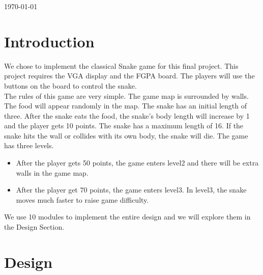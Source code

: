 \documentclass[12pt]{article}
\begin{document}
\begin{titlepage}

{\large \today}\\[2cm] %


 

\vfill %

\end{titlepage}

\newpage
\section*{Introduction}
We chose to implement the classical Snake game for this final project. This project requires the VGA display and the FGPA board. The players will use the buttons on the board to control the snake.\\
The rules of this game are very simple. The game map is surrounded by walls. The food will appear randomly in the map. The snake has an initial length of three. After the snake eats the food, the snake's body length will increase by 1 and the player gets 10 points. The snake has a maximum length of 16. If the snake hits the wall or collides with its own body, the snake will die. The game has three levels.
\begin{itemize}
\item After the player gets 50 points, the game enters level2 and there will be extra walls in the game map.
\item After the player get 70 points, the game enters level3. In level3, the snake moves much faster to raise game difficulty.
\end{itemize}
We use 10 modules to implement the entire design and we will explore them in the Design Section.

\section*{Design}
\end{document}

